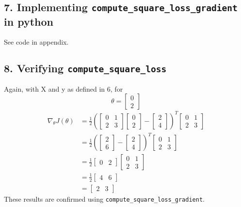 \documentclass[paper=a4, fontsize=11pt]{scrartcl} %
\numberwithin{equation}{section} %
\numberwithin{figure}{section} %
\numberwithin{table}{section} %
\begin{document}
\subsection*{7. Implementing \texttt{compute\_square\_loss\_gradient} in python}

See code in appendix.

\subsection*{8. Verifying \texttt{compute\_square\_loss}}

Again, with X and y as defined in 6, for 
\[
\theta =
	\begin{bmatrix}
		0 \\
		2
	\end{bmatrix}
\]
\begin{align*}
\nabla_{\theta}J(\theta) &= \frac{1}{2} \left(
\begin{bmatrix}
	0 & 1\\
	2 & 3
\end{bmatrix}
\begin{bmatrix}
	0 \\
	2
\end{bmatrix}
-
\begin{bmatrix}
	2 \\
	4
\end{bmatrix}
\right)^T
\begin{bmatrix}
	0 & 1\\
	2 & 3
\end{bmatrix} \\
   &= 
\frac{1}{2} \left(
\begin{bmatrix}
	2 \\
	6
\end{bmatrix}
-
\begin{bmatrix}
	2 \\
	4
\end{bmatrix}
\right)^T
\begin{bmatrix}
	0 & 1\\
	2 & 3
\end{bmatrix} \\
   &= 
\frac{1}{2} 
\begin{bmatrix}
	0 & 2
\end{bmatrix}
\begin{bmatrix}
	0 & 1\\
	2 & 3
\end{bmatrix} \\
&=
\frac{1}{2} 
\begin{bmatrix}
	4 & 6
\end{bmatrix} \\
&=
\begin{bmatrix}
	2 & 3
\end{bmatrix}
\end{align*}
These results are confirmed using \texttt{compute\_square\_loss\_gradient}.
\end{document}

